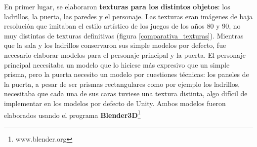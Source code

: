 En primer lugar, se elaboraron \textbf{texturas para los distintos objetos}: los ladrillos, la puerta, las paredes y el personaje. Las texturas eran imágenes de baja resolución que imitaban el estilo artístico de los juegos de los años 80 y 90, no muy distintas de texturas definitivas (figura \ref{comparativa_texturas}). Mientras que la sala y los ladrillos conservaron sus simple modelos por defecto, fue necesario elaborar modelos para el personaje principal y la puerta. El personaje principal necesitaba un modelo que lo hiciese más expresivo que un simple prisma, pero la puerta necesito un modelo por cuestiones técnicas: los paneles de la puerta, a pesar de ser prismas rectangulares como por ejemplo los ladrillos, necesitaba que cada una de sus caras tuviese una textura distinta, algo difícil de implementar en los modelos por defecto de Unity. Ambos modelos fueron elaborados usando el programa \textbf{Blender3D}\footnote{www.blender.org}
